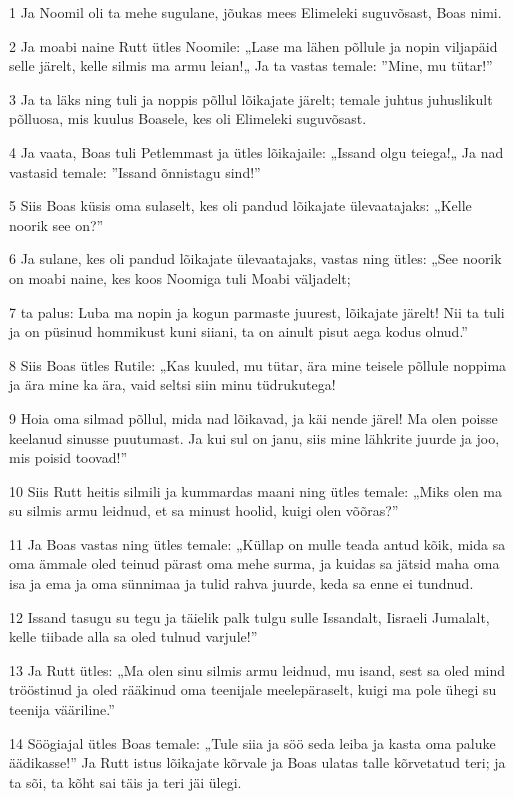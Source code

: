 \par 1 Ja Noomil oli ta mehe sugulane, jõukas mees Elimeleki suguvõsast, Boas nimi.
\par 2 Ja moabi naine Rutt ütles Noomile: „Lase ma lähen põllule ja nopin viljapäid selle järelt, kelle silmis ma armu leian!„ Ja ta vastas temale: ”Mine, mu tütar!”
\par 3 Ja ta läks ning tuli ja noppis põllul lõikajate järelt; temale juhtus juhuslikult põlluosa, mis kuulus Boasele, kes oli Elimeleki suguvõsast.
\par 4 Ja vaata, Boas tuli Petlemmast ja ütles lõikajaile: „Issand olgu teiega!„ Ja nad vastasid temale: ”Issand õnnistagu sind!”
\par 5 Siis Boas küsis oma sulaselt, kes oli pandud lõikajate ülevaatajaks: „Kelle noorik see on?”
\par 6 Ja sulane, kes oli pandud lõikajate ülevaatajaks, vastas ning ütles: „See noorik on moabi naine, kes koos Noomiga tuli Moabi väljadelt;
\par 7 ta palus: Luba ma nopin ja kogun parmaste juurest, lõikajate järelt! Nii ta tuli ja on püsinud hommikust kuni siiani, ta on ainult pisut aega kodus olnud.”
\par 8 Siis Boas ütles Rutile: „Kas kuuled, mu tütar, ära mine teisele põllule noppima ja ära mine ka ära, vaid seltsi siin minu tüdrukutega!
\par 9 Hoia oma silmad põllul, mida nad lõikavad, ja käi nende järel! Ma olen poisse keelanud sinusse puutumast. Ja kui sul on janu, siis mine lähkrite juurde ja joo, mis poisid toovad!”
\par 10 Siis Rutt heitis silmili ja kummardas maani ning ütles temale: „Miks olen ma su silmis armu leidnud, et sa minust hoolid, kuigi olen võõras?”
\par 11 Ja Boas vastas ning ütles temale: „Küllap on mulle teada antud kõik, mida sa oma ämmale oled teinud pärast oma mehe surma, ja kuidas sa jätsid maha oma isa ja ema ja oma sünnimaa ja tulid rahva juurde, keda sa enne ei tundnud.
\par 12 Issand tasugu su tegu ja täielik palk tulgu sulle Issandalt, Iisraeli Jumalalt, kelle tiibade alla sa oled tulnud varjule!”
\par 13 Ja Rutt ütles: „Ma olen sinu silmis armu leidnud, mu isand, sest sa oled mind trööstinud ja oled rääkinud oma teenijale meelepäraselt, kuigi ma pole ühegi su teenija vääriline.”
\par 14 Söögiajal ütles Boas temale: „Tule siia ja söö seda leiba ja kasta oma paluke äädikasse!” Ja Rutt istus lõikajate kõrvale ja Boas ulatas talle kõrvetatud teri; ja ta sõi, ta kõht sai täis ja teri jäi ülegi.
